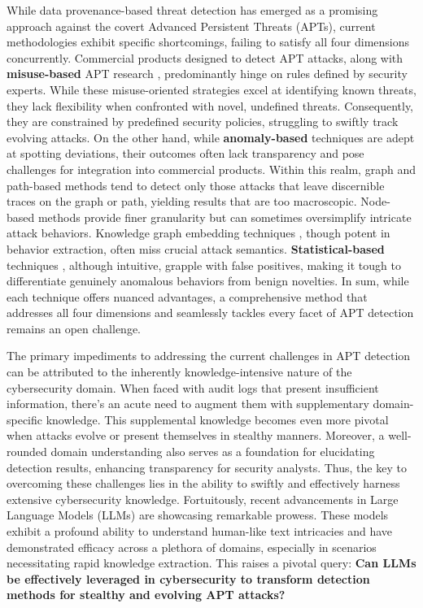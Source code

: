 While data provenance-based threat detection has emerged as a promising approach against the covert Advanced Persistent Threats (APTs), current methodologies exhibit specific shortcomings, failing to satisfy all four dimensions concurrently.
Commercial products designed to detect APT attacks, along with \textbf{misuse-based} APT research \cite{milajerdi2019holmes,milajerdi2019poirot,hossain2020combating}, predominantly hinge on rules defined by security experts. While these misuse-oriented strategies excel at identifying known threats, they lack flexibility when confronted with novel, undefined threats. Consequently, they are constrained by predefined security policies, struggling to swiftly track evolving attacks.
On the other hand, while \textbf{anomaly-based} techniques \cite{wang2022threatrace,han2020unicorn,wang2020you} are adept at spotting deviations, their outcomes often lack transparency and pose challenges for integration into commercial products. Within this realm, graph \cite{manzoor2016fast,han2020unicorn,li2021hierarchical,yang2023prographer,cheng2023kairos} and path-based methods \cite{wang2020you,alsaheel2021atlas} tend to detect only those attacks that leave discernible traces on the graph or path, yielding results that are too macroscopic. Node-based methods provide finer granularity but can sometimes oversimplify intricate attack behaviors. Knowledge graph embedding techniques \cite{zeng2021watson,zengy2022shadewatcher}, though potent in behavior extraction, often miss crucial attack semantics. 
\textbf{Statistical-based} techniques \cite{liu2018towards,hassan2019nodoze,hassan2020we}, although intuitive, grapple with false positives, making it tough to differentiate genuinely anomalous behaviors from benign novelties. 
In sum, while each technique offers nuanced advantages, a comprehensive method that addresses all four dimensions and seamlessly tackles every facet of APT detection remains an open challenge.


The primary impediments to addressing the current challenges in APT detection can be attributed to the inherently knowledge-intensive nature of the cybersecurity domain. When faced with audit logs that present insufficient information, there's an acute need to augment them with supplementary domain-specific knowledge. This supplemental knowledge becomes even more pivotal when attacks evolve or present themselves in stealthy manners. Moreover, a well-rounded domain understanding also serves as a foundation for elucidating detection results, enhancing transparency for security analysts. Thus, the key to overcoming these challenges lies in the ability to swiftly and effectively harness extensive cybersecurity knowledge.
Fortuitously, recent advancements in Large Language Models (LLMs) are showcasing remarkable prowess. These models exhibit a profound ability to understand human-like text intricacies and have demonstrated efficacy across a plethora of domains, especially in scenarios necessitating rapid knowledge extraction. This raises a pivotal query: \textbf{Can LLMs be effectively leveraged in cybersecurity to transform detection methods for stealthy and evolving APT attacks?}

